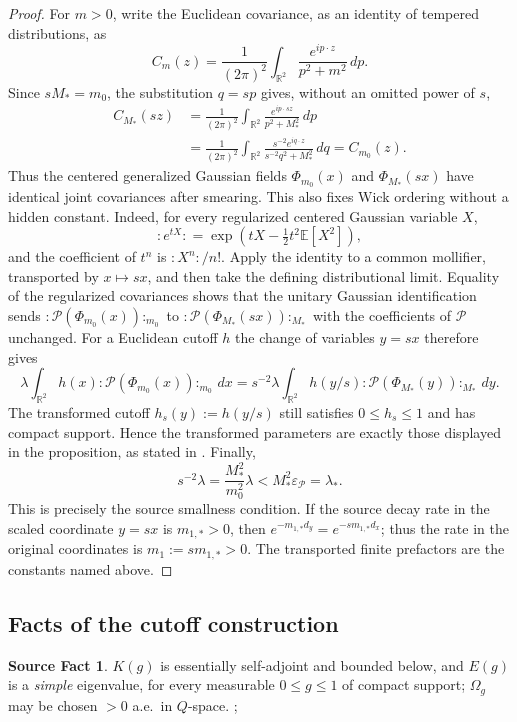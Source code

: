 \documentclass[11pt,a4paper]{article}
\theoremstyle{plain}
\theoremstyle{definition}
\newtheorem{srcfact}[theorem]{Source Fact}
\newcommand{\R}{\mathbb{R}}
\newcommand{\E}{\mathbb{E}}
\newcommand{\Om}{\Omega}
\begin{document}
\begin{proof}
For $m>0$, write the Euclidean covariance, as an identity of tempered distributions, as
\[
  C_m(z)=\frac1{(2\pi)^2}\int_{\R^2}\frac{e^{ip\cdot z}}{p^2+m^2}\,dp .
\]
Since $sM_*=m_0$, the substitution $q=sp$ gives, without an omitted power of $s$,
\begin{align*}
  C_{M_*}(sz)
  &=\frac1{(2\pi)^2}\int_{\R^2}
      \frac{e^{ip\cdot sz}}{p^2+M_*^2}\,dp \\
  &=\frac1{(2\pi)^2}\int_{\R^2}
      \frac{s^{-2}e^{iq\cdot z}}{s^{-2}q^2+M_*^2}\,dq
    =C_{m_0}(z).
\end{align*}
Thus the centered generalized Gaussian fields $\Phi_{m_0}(x)$ and $\Phi_{M_*}(sx)$ have
identical joint covariances after smearing. This also fixes Wick ordering without a hidden
constant. Indeed, for every regularized centered Gaussian variable $X$,
\[
 {:}e^{tX}{:}=\exp\!\left(tX-\tfrac12t^2\E[X^2]\right),
\]
and the coefficient of $t^n$ is ${:}X^n{:}/n!$. Apply the identity to a common mollifier,
transported by $x\mapsto sx$, and then take the defining distributional limit. Equality of the
regularized covariances shows that the unitary Gaussian identification sends
${:}\mathscr P(\Phi_{m_0}(x)){:}_{m_0}$ to
${:}\mathscr P(\Phi_{M_*}(sx)){:}_{M_*}$ with the coefficients of $\mathscr P$ unchanged.
For a Euclidean cutoff $h$ the change of variables $y=sx$ therefore gives
\[
 \lambda\int_{\R^2}h(x){:}\mathscr P(\Phi_{m_0}(x)){:}_{m_0}\,dx
 =s^{-2}\lambda\int_{\R^2}h(y/s){:}\mathscr P(\Phi_{M_*}(y)){:}_{M_*}\,dy .
\]
The transformed cutoff $h_s(y):=h(y/s)$ still satisfies $0\le h_s\le1$ and has compact
support. Hence the transformed parameters are exactly those displayed in the proposition,
as stated in \cite[p.~590]{GJS}. Finally,
\[
 s^{-2}\lambda=\frac{M_*^2}{m_0^2}\lambda
 <M_*^2\varepsilon_{\mathscr P}=\lambda_*.
\]
This is precisely the source smallness condition. If the source decay rate in the scaled
coordinate $y=sx$ is $m_{1,*}>0$, then
$e^{-m_{1,*}d_y}=e^{-sm_{1,*}d_x}$; thus the rate in the original coordinates is
$m_1:=sm_{1,*}>0$. The transported finite prefactors are the constants named above.
\end{proof}

\subsection{Facts of the cutoff construction}\label{subsec:facts}

\begin{srcfact}\label{fact:sa}
$K(g)$ is essentially self-adjoint and bounded below, and $E(g)$ is a \emph{simple} eigenvalue,
for every measurable $0\le g\le1$ of compact support; $\Om_g$ may be chosen $>0$ a.e.\ in
$Q$-space. \cite[p.~588]{GJS}; \cite{GJ1,GJ2,Rosen70,GJ71}
\end{srcfact}
\end{document}
